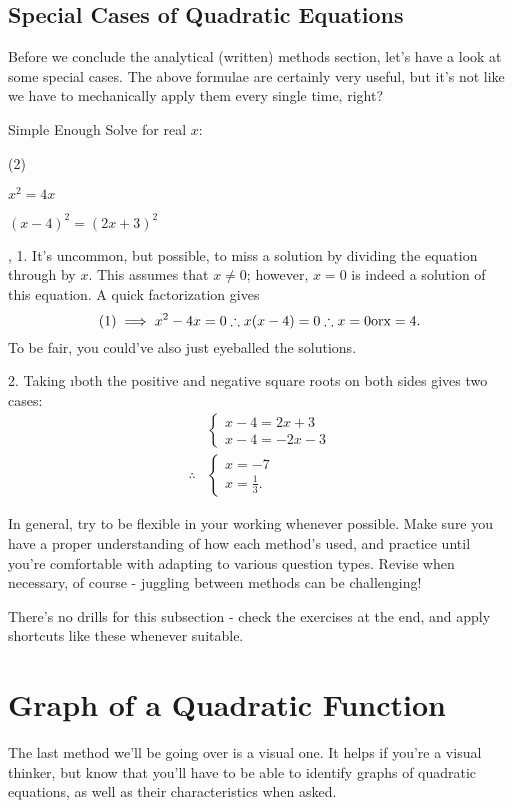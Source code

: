 \subsection{Special Cases of Quadratic Equations}
Before we conclude the analytical (written) methods section, let's have a look at some special cases. The above formulae are certainly very useful, but it's not like we have to mechanically apply them every single time, right?
\begin{example}{Simple Enough}
Solve for real $x$:
\begin{question_set}(2)
    \item $x^2=4x$
    \item $(x-4)^2=(2x+3)^2$
\end{question_set}
\sep
1. It's uncommon, but possible, to miss a solution by dividing the equation through by $x$. This assumes that $x\neq0$; however, $x=0$ is indeed a solution of this equation. A quick factorization gives $$(1)\implies x^2-4x=0\therefore x(x-4)=0\therefore x=0\rm{ or } x=4.$$
To be fair, you could've also just eyeballed the solutions.

2. Taking \i{both the positive and negative} square roots on both sides gives two cases:
\begin{align}
    &\begin{cases}x-4=2x+3\\x-4=-2x-3\end{cases} \\
    \therefore&\begin{cases}x=-7\\x=\frac13.\end{cases}
\end{align}
\end{example}
In general, try to be flexible in your working whenever possible. Make sure you have a proper understanding of how each method's used, and practice until you're comfortable with adapting to various question types. Revise when necessary, of course - juggling between methods can be challenging!


There's no drills for this subsection - check the exercises at the end, and apply shortcuts like these whenever suitable.

\section{Graph of a Quadratic Function}
The last method we'll be going over is a visual one. It helps if you're a visual thinker, but know that you'll have to be able to identify graphs of quadratic equations, as well as their characteristics when asked.

